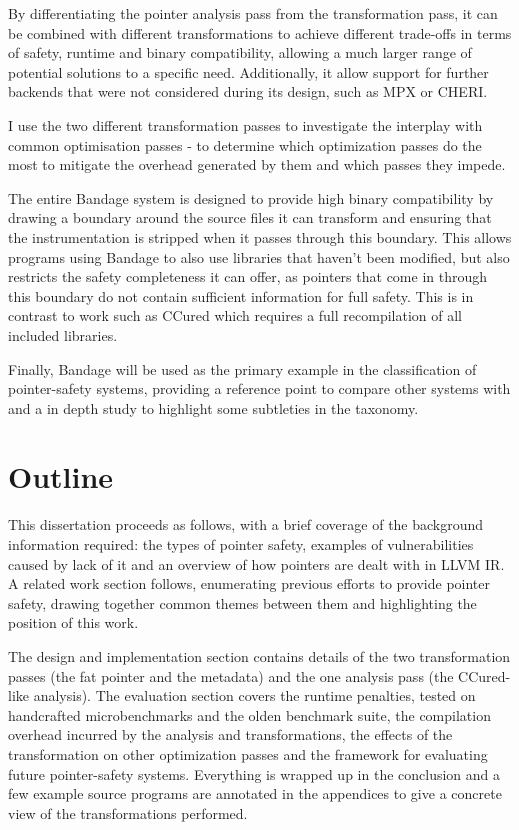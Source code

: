 \documentclass[a4paper,12pt,twoside,openright]{report}
\begin{document}
By differentiating the pointer analysis pass from the transformation pass, it can be combined with different transformations to achieve different trade-offs in terms of safety, runtime and binary compatibility, allowing a much larger range of potential solutions to a specific need.
Additionally, it allow support for further backends that were not considered during its design, such as MPX or CHERI.

I use the two different transformation passes to investigate the interplay with common optimisation passes - to determine which optimization passes do the most to mitigate the overhead generated by them and which passes they impede.

The entire Bandage system is designed to provide high binary compatibility by drawing a boundary around the source files it can transform and ensuring that the instrumentation is stripped when it passes through this boundary.
This allows programs using Bandage to also use libraries that haven't been modified, but also restricts the safety completeness it can offer, as pointers that come in through this boundary do not contain sufficient information for full safety.
This is in contrast to work such as CCured which requires a full recompilation of all included libraries.

Finally, Bandage will be used as the primary example in the classification of pointer-safety systems, providing a reference point to compare other systems with and a in depth study to highlight some subtleties in the taxonomy.

\section{Outline}

This dissertation proceeds as follows, with a brief coverage of the background information required: the types of pointer safety, examples of vulnerabilities caused by lack of it and an overview of how pointers are dealt with in LLVM IR.
A related work section follows, enumerating previous efforts to provide pointer safety, drawing together common themes between them and highlighting the position of this work.

The design and implementation section contains details of the two transformation passes (the fat pointer and the metadata) and the one analysis pass (the CCured-like analysis).
The evaluation section covers the runtime penalties, tested on handcrafted microbenchmarks and the olden benchmark suite, the compilation overhead incurred by the analysis and transformations, the effects of the transformation on other optimization passes and the framework for evaluating future pointer-safety systems.
Everything is wrapped up in the conclusion and a few example source programs are annotated in the appendices to give a concrete view of the transformations performed.
\end{document}
